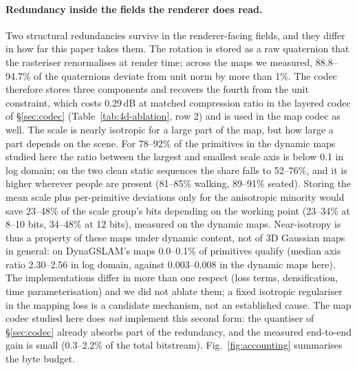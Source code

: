 \documentclass[10pt,twocolumn,letterpaper]{article}
\newcommand{\gate}[1]{{#1}} %
\begin{document}
\paragraph{Redundancy inside the fields the renderer does read.}
Two structural redundancies survive in the renderer-facing fields, and they differ in
how far this paper takes them.
The rotation is
stored as a raw quaternion that the rasteriser renormalises at render time; across the
maps we measured, \gate{88.8--94.7\%} of the quaternions deviate from unit norm by
more than 1\%. %
The codec therefore stores three components and recovers the fourth from the unit
constraint, which costs \gate{0.29}\,dB at matched compression ratio in the layered
codec of \S\ref{sec:codec} (Table~\ref{tab:4d-ablation}, row 2) and is used in the
map codec as well.
The scale is nearly isotropic for a large part of the map, but how large a part depends on
the scene. For \gate{78--92\%} of the primitives in the dynamic maps studied here the ratio
between the largest and smallest scale axis is below \gate{0.1} in log domain; on the two
clean static sequences the share falls to \gate{52--76\%}, and it is higher wherever people
are present (\gate{81--85\%} walking, \gate{89--91\%} seated). %
Storing the mean scale plus per-primitive deviations only for the anisotropic minority would
save \gate{23--48\%} of the scale group's bits depending on the working point (23--34\% at
8--10 bits, 34--48\% at 12 bits), measured on the dynamic maps.
Near-isotropy is thus a property of these maps under dynamic content, not of 3D
Gaussian maps in general: on DynaGSLAM's maps \gate{0.0--0.1\%} of primitives qualify
(median axis ratio \gate{2.30--2.56} in log domain, against \gate{0.003--0.008} in the
dynamic maps here).
The implementations differ in more than one respect (loss terms, densification, time
parameterisation) and we did not ablate them; a fixed isotropic regulariser in the mapping
loss is a candidate mechanism, not an established cause. %
The map codec studied here does \emph{not} implement this second form: the quantiser of
\S\ref{sec:codec} already absorbs part of the redundancy, and the measured end-to-end
gain is small (\gate{0.3--2.2\%} of the total bitstream). %
Fig.~\ref{fig:accounting} summarises the byte budget.
\end{document}
